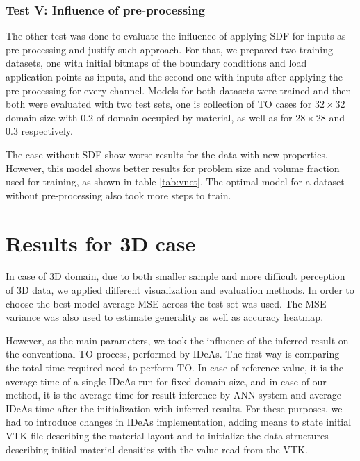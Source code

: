 \subsubsection{Test V: Influence of pre-processing}
The other test was done to evaluate the influence of applying SDF for inputs as pre-processing and justify such approach.
For that, we prepared two training datasets, one with initial bitmaps of the boundary conditions and load application points as inputs, and the second one with inputs after applying the pre-processing for every channel.
Models for both datasets were trained and then both were evaluated with two test sets, one is collection of TO cases for $32 \times 32$ domain size with $0.2$ of domain occupied by material, as well as for $28 \times 28 $ and $0.3$ respectively.
\medskip

The case without SDF show worse results for the data with new properties. 
However, this model shows better results for problem size and volume fraction used for training, as shown in table \ref{tab:vnet}.
The optimal model for a dataset without pre-processing also took more steps to train.
\medskip

\section{Results for 3D case}

In case of 3D domain, due to both smaller sample and more difficult perception of 3D data, we applied different visualization and evaluation methods.
In order to choose the best model average MSE across the test set was used.
The MSE variance was also used to estimate generality as well as accuracy heatmap.
\medskip 

However, as the main parameters, we took the influence of the inferred result on the conventional TO process, performed by IDeAs.
The first way is comparing the total time required need to perform TO. 
In case of reference value, it is the average time of a single IDeAs run for fixed domain size, and in case of our method, it is the average time for result inference by ANN system and average IDeAs time after the initialization with inferred results.
For these purposes, we had to introduce changes in IDeAs implementation, adding means to state initial VTK file describing the material layout and to initialize the data structures describing initial material densities with the value read from the VTK.
\medskip

